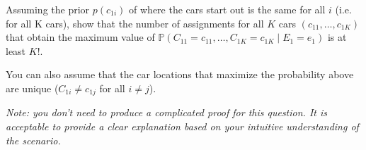 \item {}
Assuming the prior $p(c_{1i})$ of where the cars start out is the same for all
$i$ (i.e. for all K cars), show that the number of assignments for all $K$ cars
$(c_{11}, \dots, c_{1K})$ that obtain the maximum value of $\mathbb P(C_{11} =
c_{11}, \dots, C_{1K} = c_{1K} \mid E_1 = e_1)$ is at least $K!$.

You can also assume that the car locations that maximize the probability above
are unique ($C_{1i} \neq c_{1j}$ for all $i \neq j$).

{\em Note: you don't need to produce a complicated proof for this question.
It is acceptable to provide a clear explanation based on your intuitive understanding of the scenario.}
